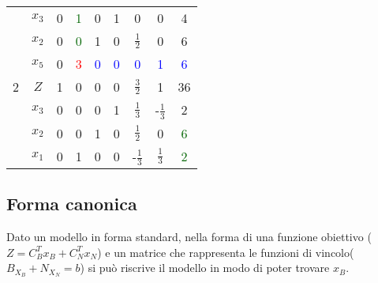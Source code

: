 \documentclass{article}
\begin{document}
\begin{table}[h]
\begin{tabular}{|c|c|c|c|c|c|c|c|c|}
                                 & $x_3$                        & 0                                          & \textcolor{darkgreen}{1} & 0                        & 1                   & 0                   & 0                   & 4                        \\
                                 & $x_2$                        & 0                                          & \textcolor{darkgreen}{0} & 1                        & 0                   & $\frac{1}{2}$       & 0                   & 6                        \\
                                 & $x_5$                        & 0                                          & \textcolor{red}{3}       & \textcolor{blue}{0}      & \textcolor{blue}{0} & \textcolor{blue}{0} & \textcolor{blue}{1} & \textcolor{blue}{6}      \\
    \hline
    2                            & $Z$                          & 1                                          & 0                        & 0                        & 0                   & $\frac{3}{2}$       & 1                   & 36                       \\
                                 & $x_3$                        & 0                                          & 0                        & 0                        & 1                   & $\frac{1}{3}$       & -$\frac{1}{3}$      & 2                        \\
                                 & $x_2$                        & 0                                          & 0                        & 1                        & 0                   & $\frac{1}{2}$       & 0                   & \textcolor{darkgreen}{6} \\
                                 & $x_1$                        & 0                                          & 1                        & 0                        & 0                   & -$\frac{1}{3}$      & $\frac{1}{3}$       & \textcolor{darkgreen}{2} \\
    \hline
  \end{tabular}
\end{table}

\subsection{Forma canonica}
Dato un modello in forma standard, nella forma di una funzione obiettivo ($Z=C_B^Tx_B+C^T_Nx_N$) e un matrice che rappresenta le funzioni di vincolo($B_{X_B}+N_{X_N}=b$) si può riscrive il modello in modo di poter trovare $x_B$.
\end{document}

